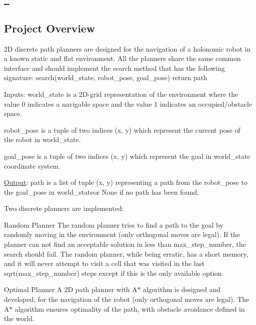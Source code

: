 \subsection*{\href{https://travis-ci.com/ajeetwankhede/Discrete-planner-for-motion-planning}\texttt{ } }

\subsection*{Project Overview}

2D discrete path planners are designed for the navigation of a holonomic robot in a known static and flat environment. All the planners share the same common interface and should implement the ​search​ method that has the following signature\+: search(world\+\_\+state, robot\+\_\+pose, goal\+\_\+pose) return path

Inputs\+: world\+\_\+state is a 2D-\/grid representation of the environment where the value 0 indicates a navigable space and the value 1 indicates an occupied/obstacle space.

robot\+\_\+pose is a tuple of two indices (x, y) which represent the current pose of the robot in world\+\_\+state​.

goal\+\_\+pose​ ​is a tuple of two indices (x, y) which represent the goal in ​world\+\_\+state coordinate system.

\mbox{\hyperlink{classOutput}{Output}}\+: path is a list of tuple (x, y) representing a path from the ​robot\+\_\+pose to the goal\+\_\+pose​ in world\+\_\+state​ or​ None​ if no path has been found.

Two discrete planners are implemented\+:


\begin{DoxyEnumerate}
\item Random Planner The random planner tries to find a path to the goal by randomly moving in the environment (only orthogonal moves are legal). If the planner can not find an acceptable solution in less than max\+\_\+step\+\_\+number, the search should fail. The random planner, while being erratic, has a short memory, and it will never attempt to visit a cell that was visited in the last ​sqrt(max\+\_\+step\+\_\+number)​ steps except if this is the only available option.
\item Optimal Planner A 2D path planner with A$\ast$ algorithm is designed and developed, for the navigation of the robot (only orthogonal moves are legal). The A$\ast$ algorithm ensures optimality of the path, with obstacle avoidance defined in the world.
\end{DoxyEnumerate}

